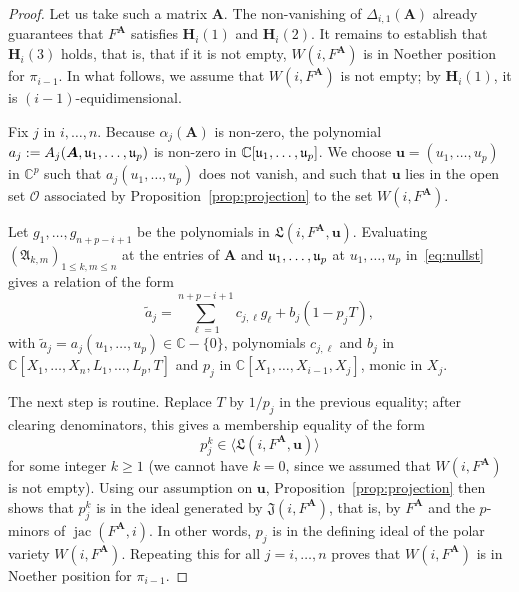\documentclass[12pt]{article}
\def\frkJ{\mathfrak{J}}
\def\frkL{\mathfrak{L}}
\def\A{\mathfrak{A}}
\def\mA{{\bm A}}
\def\D{\Delta}
\DeclareMathOperator{\jac}{jac}
\def\C{\mathbb{C}}
\begin{document}
\begin{proof}
  Let us take such a matrix $\mA$. The non-vanishing of
  $\D_{i,1}(\mA)$ already guarantees that $F^\mA$ satisfies $\bm
  H_i(1)$ and $\bm H_i(2)$. It remains to establish that $\bm H_i(3)$
  holds, that is, that if it is not empty, $W(i,F^\mA)$ is in Noether
  position for $\pi_{i-1}$. In what follows, we assume that
  $W(i,F^\mA)$ is not empty; by $\bm H_i(1)$, it is
  $(i-1)$-equidimensional.

  Fix $j$ in $i,\dots,n$. Because $\alpha_j(\mA)$ is non-zero, the
  polynomial $a_j:=A_j(\mA, \frak u_1,\dots,\frak u_p)$ is non-zero in
  $\C[\frak u_1,\dots,\frak u_p]$. We choose $\bm u=(u_1,\dots,u_p)$
  in $\C^p$ such that $a_j(u_1,\dots,u_p)$ does not vanish, and such
  that $\bm u$ lies in the open set $\mathscr{O}$ associated by
  Proposition~\ref{prop:projection} to the set $W(i,F^\mA)$.

  Let $g_1,\dots,g_{n+p-i+1}$ be the polynomials in $\frkL(i,F^\mA,\bm u)$.
  Evaluating $(\A_{k,m})_{1 \le k,m \le n}$ at the entries of $\mA$
  and $\frak u_1,\dots,\frak u_p$ at $u_1,\dots,u_p$
  in~\eqref{eq:nullst} gives a relation of the form 
  \[ \tilde a_j = \sum_{\ell=1}^{n+p-i+1} c_{j,\ell} g_\ell + b_j (1-p_j T), \]
  with $\tilde a_j=a_j(u_1,\dots,u_p) \in \C-\{0\}$, polynomials
  $c_{j,\ell}$ and $b_j$ in $\C[X_1,\dots,X_n,L_1,\dots,L_p,T]$ and
  $p_j$ in $\C[X_1,\dots,X_{i-1},X_j]$, monic in $X_j$.

  The next step is routine. Replace $T$ by $1/p_j$ in the previous
  equality; after clearing denominators, this gives a membership
  equality of the form
  \[
  p_j^k \in \langle \frkL(i,F^\mA,\bm u) \rangle
  \]
  for some integer $k \ge 1$ (we cannot have $k=0$, since we assumed
  that $W(i,F^\mA)$ is not empty). Using our assumption on $\bm u$,
  Proposition~\ref{prop:projection} then shows that $p_j^k$ is in the
  ideal generated by ${\frkJ}(i, F^\mA)$, that is, by $F^\mA$ and the
  $p$-minors of $\jac(F^\mA,i)$. In other words, $p_j$ is in the
  defining ideal of the polar variety $W(i,F^\mA)$. Repeating this for
  all $j=i,\dots,n$ proves that $W(i,F^\mA)$ is in Noether position for
  $\pi_{i-1}$.
\end{proof}
\end{document}
